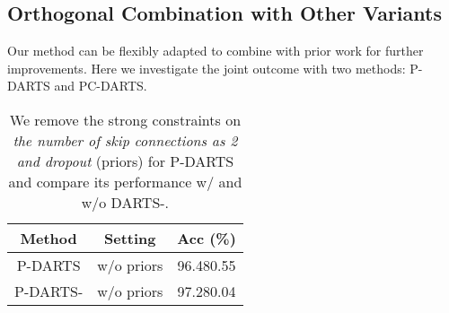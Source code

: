 \documentclass{article} \usepackage{iclr2021_conference,times}
\begin{document}
\subsection{Orthogonal Combination with Other Variants}

Our method can be flexibly adapted to combine with prior work for further improvements. Here we investigate the joint outcome with two methods: P-DARTS  and PC-DARTS.

\label{sec:pdarts-discuss}
\begin{comment}
\begin{wraptable}{r}{5.5cm}
	\vspace{-20pt}
	\setlength{\tabcolsep}{1pt}
	\small
	\centering
	\caption{Comparison of P-DARTS removing the strong prior and combining DARTS-. The results are averaged over 3 independent experiments on C10.} 
	\smallskip\begin{tabular}{cp{1cm}p{1cm}c}
		\toprule
		&  \textbf{Remove Prior (M=2)} &  \textbf{With DARTS-} &  \textbf{Acc ()}\\
		\midrule
		\multirow{2}*{P-DARTS 
		} & \checkmark &  &  96.480.55 \\
		~    &  \checkmark & \checkmark &97.280.04 \\
		\bottomrule
	\end{tabular}
	\label{tab:pdarts-darts-}
	\vspace{-10pt}
\end{wraptable}
\end{comment}

\begin{wraptable}{r}{5.5cm}
	\vspace{-20pt}
	\setlength{\tabcolsep}{1pt}
	\small
	\centering
	\caption{We remove the strong constraints on \textit{the number of skip connections as 2 and dropout }(priors) for P-DARTS and compare its performance w/ and w/o DARTS-. } 
	\smallskip\begin{tabular}{ccc}
		\toprule
		\textbf{Method} & \textbf{Setting}& \textbf{Acc (\%)} \\
		\midrule
		P-DARTS & w/o priors  & 96.480.55 \\
		P-DARTS- & w/o priors &97.280.04 \\
		\bottomrule
	\end{tabular}
	\label{tab:pdarts-darts-}
	\vspace{-12pt}
\end{wraptable}
\end{document}
